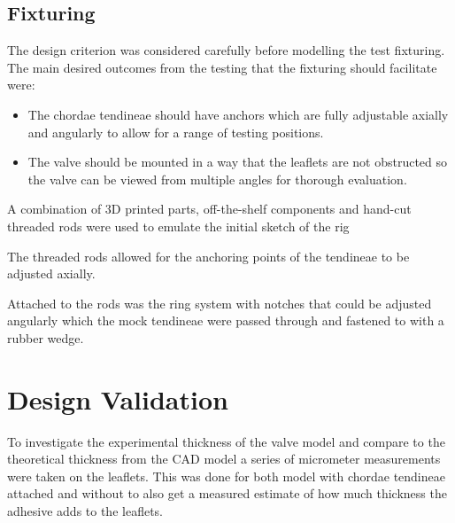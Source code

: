 \subsection{Fixturing}
The design criterion was considered carefully before modelling the test fixturing. The main desired outcomes from the testing that the fixturing should facilitate were:
\begin{itemize}
    \item The chordae tendineae should have anchors which are fully adjustable axially and angularly to allow for a range of testing positions.
    \item The valve should be mounted in a way that the leaflets are not obstructed so the valve can be viewed from multiple angles for thorough evaluation.

\end{itemize}

A combination of 3D printed parts, off-the-shelf components and hand-cut threaded rods were used to emulate the initial sketch of the rig

The threaded rods allowed for the anchoring points of the tendineae to be adjusted axially.

Attached to the rods was the ring system with notches that could be adjusted angularly which the mock tendineae were passed through and fastened to with a rubber wedge.


\section{Design Validation}
To investigate the experimental thickness of the valve model and compare to the theoretical thickness from the \gls{CAD} model a series of micrometer measurements were taken on the leaflets. This was done for both model with chordae tendineae attached and without to also get a measured estimate of how much thickness the adhesive adds to the leaflets.

